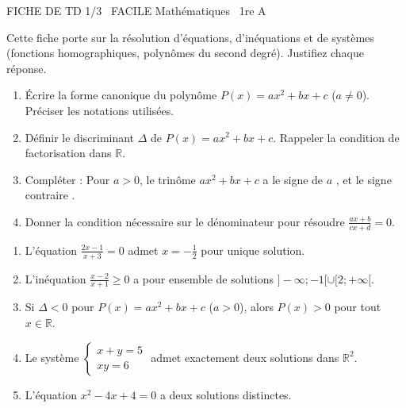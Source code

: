 \documentclass[11pt]{article}
\begin{document}
\begin{tcolorbox}[enhanced,colback=popink,colframe=popink,arc=10pt,boxrule=0pt,left=12pt,right=12pt,top=9pt,bottom=9pt]
{\color{white}\popxbold\small FICHE DE TD 1/3 \textbullet\ FACILE \hfill Mathématiques \textbullet\ 1re A\par}
\end{tcolorbox}
\vspace{4pt}
Cette fiche porte sur la résolution d'équations, d'inéquations et de systèmes (fonctions homographiques, polynômes du second degré). Justifiez chaque réponse.

\begin{exercice}
\begin{enumerate}
    \item Écrire la forme canonique du polynôme $P(x)=ax^2+bx+c$ ($a \neq 0$). Préciser les notations utilisées.
    \item Définir le discriminant $\Delta$ de $P(x)=ax^2+bx+c$. Rappeler la condition de factorisation dans $\mathbb{R}$.
    \item Compléter : Pour $a>0$, le trinôme $ax^2+bx+c$ a le signe de $a$ \underline{\hspace{3cm}}, et le signe contraire \underline{\hspace{3cm}}.
    \item Donner la condition nécessaire sur le dénominateur pour résoudre $\frac{ax+b}{cx+d}=0$.
\end{enumerate}
\end{exercice}

\begin{exercice}
\begin{enumerate}
    \item L'équation $\frac{2x-1}{x+3}=0$ admet $x=-\frac{1}{2}$ pour unique solution.
    \item L'inéquation $\frac{x-2}{x+1} \geq 0$ a pour ensemble de solutions $]-\infty; -1[ \cup [2; +\infty[$.
    \item Si $\Delta < 0$ pour $P(x)=ax^2+bx+c$ ($a>0$), alors $P(x) > 0$ pour tout $x \in \mathbb{R}$.
    \item Le système $\left\{\begin{array}{l} x+y=5 \\ xy=6 \end{array}\right.$ admet exactement deux solutions dans $\mathbb{R}^2$.
    \item L'équation $x^2 - 4x + 4 = 0$ a deux solutions distinctes.
\end{enumerate}
\end{exercice}
\end{document}
